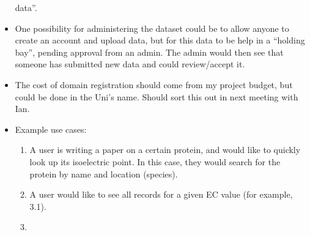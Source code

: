 \begin{itemize}
  data''.
\item One possibility for administering the dataset could be to allow anyone to
  create an account and upload data, but for this data to be help in a ``holding
  bay'', pending approval from an admin. The admin would then see that someone
  has submitted new data and could review/accept it.
\item The cost of domain registration should come from my project budget, but
  could be done in the Uni's name. Should sort this out in next meeting with
  Ian.
\item Example use cases:
  \begin{enumerate}
    \item A user is writing a paper on a certain protein, and would like to
      quickly look up its isoelectric point. In this case, they would search for
      the protein by name and location (species).
    \item A user would like to see all records for a given EC value (for
      example, 3.1).
    \item
  \end{enumerate}
\end{itemize}
